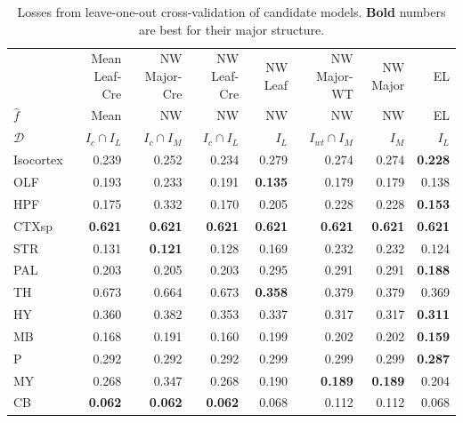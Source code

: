 \begin{table}[H]
\small
\begin{tabular}{lrrrrrrr}
\toprule
& Mean Leaf-Cre & NW Major-Cre& NW Leaf-Cre & NW Leaf &NW Major-WT  & NW Major & EL \\
$\widehat f$ &           Mean & NW & NW & NW & NW & NW &    EL \\
$\mathcal D$ & $I_c \cap I_L$ & $I_c \cap I_M$ & $I_c \cap I_L$ &  $I_L$ & $I_{wt} \cap I_M$ &  $I_M$ &  $I_L$ \\
\midrule
Isocortex &          0.239 &          0.252 &          0.234 &  0.279 &             0.274 &  0.274 & \textbf {0.228} \\
OLF       &          0.193 &          0.233 &          0.191 &  \textbf{0.135} &             0.179 &  0.179 &  0.138 \\
HPF       &          0.175 &          0.332 &          0.170 &  0.205 &             0.228 &  0.228 & \textbf {0.153} \\
CTXsp     &       \textbf   {0.621} &          \textbf{0.621} &         \textbf {0.621} & \textbf {0.621} &            \textbf {0.621} &  \textbf {0.621} &  \textbf{0.621} \\
STR       &          0.131 &         \textbf {0.121} &          0.128 &  0.169 &             0.232 &  0.232 &  0.124 \\
PAL       &          0.203 &          0.205 &          0.203 &  0.295 &             0.291 &  0.291 &  \textbf{0.188} \\
TH        &          0.673 &          0.664 &          0.673 & \textbf {0.358} &             0.379 &  0.379 &  0.369 \\
HY        &          0.360 &          0.382 &          0.353 &  0.337 &             0.317 &  0.317 &  \textbf{0.311} \\
MB        &          0.168 &          0.191 &          0.160 &  0.199 &             0.202 &  0.202 & \textbf {0.159} \\
P         &          0.292 &          0.292 &          0.292 &  0.299 &             0.299 &  0.299 &  \textbf{0.287} \\
MY        &          0.268 &          0.347 &          0.268 &  0.190 &            \textbf{ 0.189 }& \textbf {0.189} &  0.204 \\
CB        &      \textbf {   0.062} &        \textbf { 0.062 }&         \textbf {0.062 }&  0.068 &             0.112 &  0.112 &  0.068 \\
\bottomrule
\end{tabular}
\caption{Losses from leave-one-out cross-validation of candidate models. \textbf{Bold} numbers are best for their major structure.}
\label{tab:crossvalidation}
\end{table}


